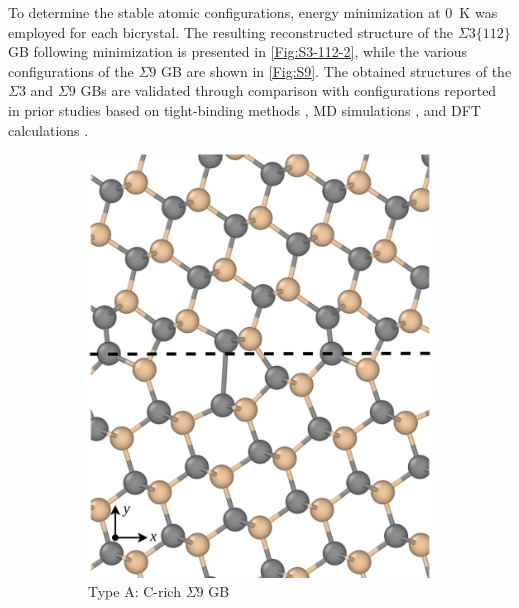 \documentclass[%
preprint,
amsmath,amssymb,
aps,
]{revtex4-2}
\newcommand{\?}{\stackrel{?}{=}}
\begin{document}
To determine the stable atomic configurations, energy minimization at 0~K was employed for each bicrystal. The resulting reconstructed structure of the $\Sigma 3 \{112\}$ GB following minimization is presented in \cref{Fig:S3-112-2}, while the various configurations of the $\Sigma 9$ GB are shown in \cref{Fig:S9}. The obtained structures of the $\Sigma 3$ and $\Sigma 9$ GBs are validated through comparison with configurations reported in prior studies based on tight-binding methods \cite{Kohyama1991,Kohyama1994,Tanaka2002}, MD simulations \cite{Kohler2002,Khalil2011}, and DFT calculations \cite{SynowczynskiDunn2020}.

\begin{figure}[h!]
\centering
\begin{subfigure}{0.3\textwidth}
 \includegraphics[width=\textwidth]{S9-1.png}
 \caption{Type A: C-rich $\Sigma 9$ GB}
 \label{Fig:S9-A}
\end{subfigure}
\hfill
\begin{subfigure}{0.3\textwidth}

\end{subfigure}
\end{figure}
\end{document}
